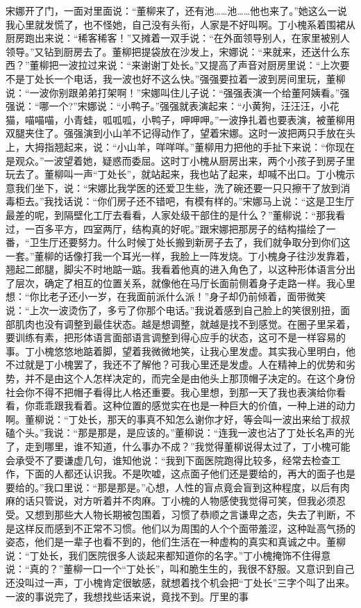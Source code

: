 \documentclass[12pt,oneside]{book}
\begin{document}
宋娜开了门，一面对里面说：``董柳来了，还有池\ldots\ldots 池\ldots\ldots 他也来了。''她这么一说我心里就发慌了，也不怪她，自己没有头衔，人家是不好叫啊。丁小槐系着围裙从厨房跑出来说：``稀客稀客！''又摊着一双手说：``在外面领导别人，在家里被别人领导。''又钻到厨房去了。董柳把提袋放在沙发上，宋娜说：``来就来，还送什么东西？''董柳把一波拉过来说：``来谢谢丁处长。''又提高了声音对厨房里说：``上次要不是丁处长一个电话，我一波也好不这么快。''强强要拉着一波到房间里玩，董柳说：``一波你别跟弟弟打架啊！''宋娜叫住儿子说：``强强表演一个给董阿姨看。''强强说：``哪一个?''宋娜说：``小鸭子。''强强就表演起来：``小黄狗，汪汪汪，小花猫，喵喵喵，小青蛙，呱呱呱，小鸭子，呷呷呷。''一波挣扎着也要表演，被董柳用双腿夹住了。强强演到小山羊不记得动作了，望着宋娜。这时一波把两只手放在头上，大拇指翘起来，说：``小山羊，咩咩咩。''董柳用力把他的手扯下来说：``你现在是观众。''一波望着她，疑惑而委屈。这时丁小槐从厨房出来，两个小孩子到房子里玩去了。董柳叫一声``丁处长''，就站起来，我也站了起来，却喊不出口。丁小槐示意我们坐下，说：``宋娜比我学医的还爱卫生些，洗了碗还要一只只擦干了放到消毒柜去。''我找话说：``你们房子还不错吧，有模有样的。''宋娜马上说：``这是卫生厅最差的呢，到隔壁化工厅去看看，人家处级干部住的是什么？''董柳说：``那我看过，一百多平方，四室两厅，结构真的好呢。''跟宋娜把那房子的结构描绘了一番，``卫生厅还要努力。什么时候丁处长搬到新房子去了，我们就争取分到你们这一套。''董柳的话像打我一个耳光一样，我脸上一阵发烧。丁小槐身子往沙发靠着，翘起二郎腿，脚尖不时地踮一踮。我看着他真的进入角色了，以这种形体语言分出了层次，确定了相互的位置关系，就像他在马厅长面前侧着身子走路一样。我心里想：``你比老子还小一岁，在我面前派什么派！''身子却仍前倾着，面带微笑说：``上次一波烫伤了，多亏了你那个电话。''我说着感到自己脸上的笑很别扭，面部肌肉也没有调整到最佳状态。越是想调整，就越是找不到感觉。在圈子里呆着，要训练有素，把形体语言面部语言调整到得心应手的状态，这可不是一样容易的事。丁小槐悠悠地踮着脚，望着我微微地笑，让我心里发虚。其实我心里明白，他不过就是丁小槐罢了，我还不了解他？可我心里还是发虚。人在精神上的优势和劣势，并不是由这个人怎样决定的，而完全是由他头上那顶帽子决定的。在这个身份社会你不得不把帽子看得比人格还重要。我心里想，到那一天了我也表演给你看看，你乖乖跟我看着。这种位置的感觉实在也是一种巨大的价值，一种上进的动力啊。董柳说：``丁处长，那天的事真不知怎么谢你才好，等会叫一波出来给丁叔叔磕个头。''我说：``那是那是，是应该的。''董柳说：``连我一波也沾了丁处长名声的光了，走到哪里，谁不知道，什么事办不成？''我觉得董柳说得太过了，丁小槐可能会承受不了要谦虚几句，谁知他说：``我到下面医院跑得比较多，经常去检查工作，下面的人都还认识我。不是吹嘘，这点面子他们还是要给的，再大的面子也是要给的。''我口里说：``那是那是。''心想，人性的盲点竟会盲到这种程度，以后有肉麻的话只管说，对方听着并不肉麻。丁小槐的人物感使我觉得可笑，但我必须忍受。又想到那些大人物长期被包围着，习惯了恭顺之言谦卑之态，失去了判断，不是这样反而感到不正常不习惯。他们以为周围的人个个面带羞涩，这种趾高气扬的姿态，他们是一辈子也看不到的，他们生活在一种虚构的真实和真诚之中。董柳说：``丁处长，我们医院很多人谈起来都知道你的名字。''丁小槐掩饰不住得意说：``真的？''董柳一口一个``丁处长''，叫和脆生生的，我很不舒服。又意识到自己还没叫过一声，丁小槐肯定很敏感，就想着找个机会把``丁处长''三字个叫了出来。一波的事说完了，我想找些话来说，竟找不到。厅里的事
\end{document}
